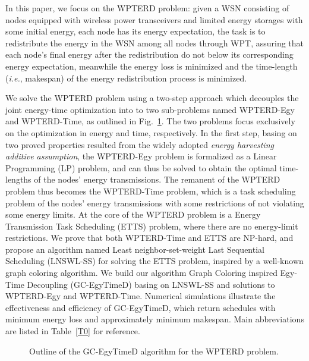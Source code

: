 \documentclass[12pt,journal,onecolumn,draftcls]{IEEEtran}
\begin{document}
In this paper, we focus on the WPTERD problem: given a WSN consisting of nodes equipped with wireless power transceivers and limited energy storages with some initial energy, each node has its energy expectation, the task is to redistribute the energy in the WSN among all nodes through WPT, assuring that each node's final energy after the redistribution do not below its corresponding energy expectation, meanwhile the energy loss is minimized and the time-length (\textit{i.e.}, makespan) of the energy redistribution process is minimized.


We solve the WPTERD problem using a two-step approach which decouples the joint energy-time optimization into to two sub-problems named WPTERD-Egy and WPTERD-Time, as outlined in Fig.~\ref{fig_outline}. The two problems focus exclusively on the optimization in energy and time, respectively. In the first step, basing on two proved properties resulted from the widely adopted \textit{energy harvesting additive assumption}, the WPTERD-Egy problem is formalized as a Linear Programming (LP) problem, and can thus be solved to obtain the optimal time-lengths of the nodes' energy transmissions. The remanent of the WPTERD problem thus becomes the WPTERD-Time problem, which is a task scheduling problem of the nodes' energy transmissions with some restrictions of not violating some energy limits. At the core of the WPTERD problem is a Energy Transmission Task Scheduling (ETTS) problem, where there are no energy-limit restrictions. We prove that both WPTERD-Time and ETTS are NP-hard, and propose an algorithm named Least neighbor-set-weight Last Sequential Scheduling (LNSWL-SS) for solving the ETTS problem, inspired by a well-known graph coloring algorithm. We build our algorithm Graph Coloring inspired Egy-Time Decoupling (GC-EgyTimeD) basing on LNSWL-SS and solutions to WPTERD-Egy and WPTERD-Time. Numerical simulations illustrate the effectiveness and efficiency of GC-EgyTimeD, which return schedules with minimum energy loss and approximately minimum makespan. Main abbreviations are listed in Table~\ref{T0} for reference.

\begin{figure}[htb]
\caption{Outline of the GC-EgyTimeD algorithm for the WPTERD problem.}
\label{fig_outline}
\end{figure}
\end{document}
